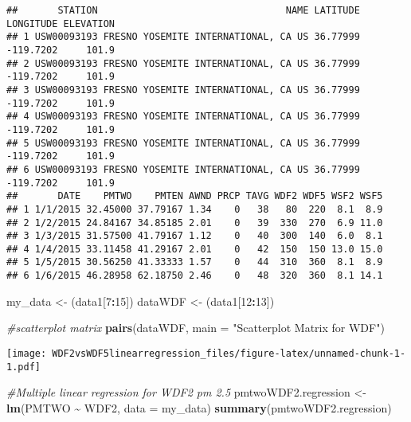 \documentclass[
]{article}
\newenvironment{Shaded}{\begin{snugshade}}{\end{snugshade}}
\newcommand{\AttributeTok}[1]{\textcolor[rgb]{0.13,0.29,0.53}{#1}}
\newcommand{\CommentTok}[1]{\textcolor[rgb]{0.56,0.35,0.01}{\textit{#1}}}
\newcommand{\DecValTok}[1]{\textcolor[rgb]{0.00,0.00,0.81}{#1}}
\newcommand{\FunctionTok}[1]{\textcolor[rgb]{0.13,0.29,0.53}{\textbf{#1}}}
\newcommand{\NormalTok}[1]{#1}
\newcommand{\OtherTok}[1]{\textcolor[rgb]{0.56,0.35,0.01}{#1}}
\newcommand{\SpecialCharTok}[1]{\textcolor[rgb]{0.81,0.36,0.00}{\textbf{#1}}}
\newcommand{\StringTok}[1]{\textcolor[rgb]{0.31,0.60,0.02}{#1}}
\begin{document}
\begin{verbatim}
##       STATION                                 NAME LATITUDE LONGITUDE ELEVATION
## 1 USW00093193 FRESNO YOSEMITE INTERNATIONAL, CA US 36.77999 -119.7202     101.9
## 2 USW00093193 FRESNO YOSEMITE INTERNATIONAL, CA US 36.77999 -119.7202     101.9
## 3 USW00093193 FRESNO YOSEMITE INTERNATIONAL, CA US 36.77999 -119.7202     101.9
## 4 USW00093193 FRESNO YOSEMITE INTERNATIONAL, CA US 36.77999 -119.7202     101.9
## 5 USW00093193 FRESNO YOSEMITE INTERNATIONAL, CA US 36.77999 -119.7202     101.9
## 6 USW00093193 FRESNO YOSEMITE INTERNATIONAL, CA US 36.77999 -119.7202     101.9
##       DATE    PMTWO    PMTEN AWND PRCP TAVG WDF2 WDF5 WSF2 WSF5
## 1 1/1/2015 32.45000 37.79167 1.34    0   38   80  220  8.1  8.9
## 2 1/2/2015 24.84167 34.85185 2.01    0   39  330  270  6.9 11.0
## 3 1/3/2015 31.57500 41.79167 1.12    0   40  300  140  6.0  8.1
## 4 1/4/2015 33.11458 41.29167 2.01    0   42  150  150 13.0 15.0
## 5 1/5/2015 30.56250 41.33333 1.57    0   44  310  360  8.1  8.9
## 6 1/6/2015 46.28958 62.18750 2.46    0   48  320  360  8.1 14.1
\end{verbatim}

\begin{Shaded}
\begin{Highlighting}[]
\NormalTok{my\_data }\OtherTok{\textless{}{-}}\NormalTok{ (data1[}\DecValTok{7}\SpecialCharTok{:}\DecValTok{15}\NormalTok{])}
\NormalTok{dataWDF }\OtherTok{\textless{}{-}}\NormalTok{ (data1[}\DecValTok{12}\SpecialCharTok{:}\DecValTok{13}\NormalTok{])}

\CommentTok{\#scatterplot matrix }
\FunctionTok{pairs}\NormalTok{(dataWDF, }\AttributeTok{main =} \StringTok{"Scatterplot Matrix for WDF"}\NormalTok{)}
\end{Highlighting}
\end{Shaded}

\texttt{[image: WDF2vsWDF5linearregression\_files/figure-latex/unnamed-chunk-1-1.pdf]}

\begin{Shaded}
\begin{Highlighting}[]
\CommentTok{\#Multiple linear regression for WDF2 pm 2.5}
\NormalTok{pmtwoWDF2.regression }\OtherTok{\textless{}{-}} \FunctionTok{lm}\NormalTok{(PMTWO }\SpecialCharTok{\textasciitilde{}}\NormalTok{ WDF2, }\AttributeTok{data =}\NormalTok{ my\_data)}
\FunctionTok{summary}\NormalTok{(pmtwoWDF2.regression)}
\end{Highlighting}
\end{Shaded}
\end{document}
